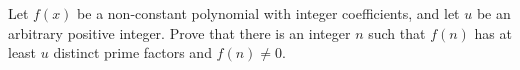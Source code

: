 Let $f\left(x\right)$ be a non-constant polynomial with integer coefficients, and let $u$ be an arbitrary positive integer. Prove that there is an integer $n$ such that $f\left(n\right)$ has at least $u$ distinct prime factors and $f\left(n\right) \neq 0$.
